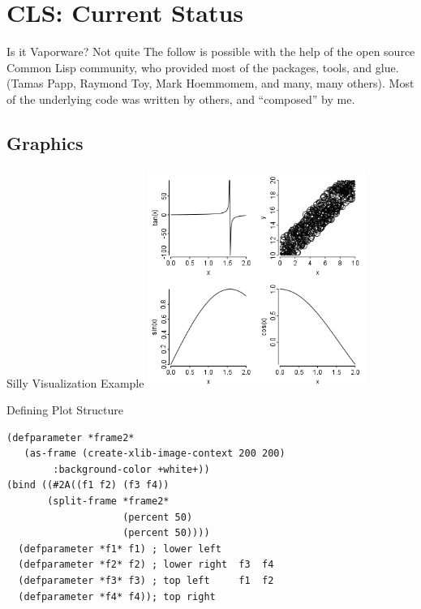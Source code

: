 \documentclass{beamer}
\begin{document}
\section{CLS: Current Status}

\label{sec:work}

\begin{frame}{Is it Vaporware? Not quite}
  The follow is possible with the help of the open source Common Lisp
  community, who provided most of the packages, tools, and glue.
  (Tamas Papp, Raymond Toy, Mark Hoemmomem, and many, many others).
  Most of the underlying code was written by others, and ``composed''
  by me.
\end{frame}

\subsection{Graphics}
\label{sec:work:graphics}

\begin{frame}{Silly Visualization Example}
  \includegraphics[width=2.8in,height=2.8in]{./test1.png}
\end{frame}

\begin{frame}[fragile]{Defining Plot Structure}
\begin{verbatim}
(defparameter *frame2*
   (as-frame (create-xlib-image-context 200 200)
   	    :background-color +white+))
(bind ((#2A((f1 f2) (f3 f4))
       (split-frame *frame2*
                    (percent 50)
                    (percent 50))))
  (defparameter *f1* f1) ; lower left   
  (defparameter *f2* f2) ; lower right  f3  f4
  (defparameter *f3* f3) ; top left     f1  f2
  (defparameter *f4* f4)); top right
\end{verbatim}
\end{frame}
\end{document}
